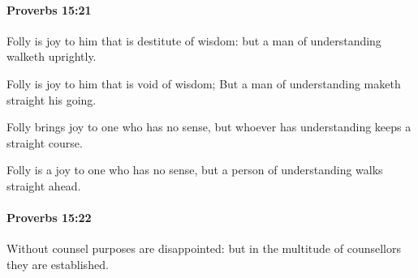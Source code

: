 		\paragraph{Proverbs 15:21} %
			\label{PROVERBS-15-21}

			Folly is joy to him that is destitute of wisdom: but a man of understanding walketh uprightly.

			\begin{versebox}
					\item[BHS] 
					\item[ASV] Folly is joy to him that is void of wisdom; But a man of understanding maketh straight his going.
					\item[NIV] Folly brings joy to one who has no sense, but whoever has understanding keeps a straight course.
					\item[NRSV] Folly is a joy to one who has no sense, but a person of understanding walks straight ahead.
			\end{versebox}

		\paragraph{Proverbs 15:22} %
			\label{PROVERBS-15-22}

			Without counsel purposes are disappointed: but in the multitude of counsellors they are established.

